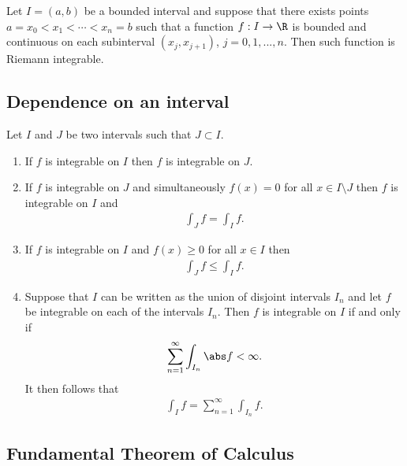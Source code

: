 \documentclass{article}
\begin{document}
\begin{corollary*}
   Let $I=(a,b)$ be a bounded interval and suppose that there exists points $a=x_0<x_1<\cdots<x_n=b$
   such that a function $f:I\to\R$ is bounded and continuous on each subinterval $(x_j,x_{j+1})$,
   $j=0,1,...,n$. Then such function is Riemann integrable.
\end{corollary*}

\subsection{Dependence on an interval}

\begin{theorem}[Notes 4.8]
    Let $I$ and $J$ be two intervals such that $J\subset I$.
    \begin{enumerate}
        \item If $f$ is integrable on $I$ then $f$ is integrable on $J$.
        \item If $f$ is integrable on $J$ and simultaneously $f(x)=0$ for all $x\in I\setminus J$
            then $f$ is integrable on $I$ and \begin{align*}
                \int_J f = \int_I f.
            \end{align*} 
        \item If $f$ is integrable on $I$ and $f(x)\geq 0$ for all $x\in I$ then \begin{align*}
            \int_J f \leq \int_I f.
        \end{align*}
        \item Suppose that $I$ can be written as the union of disjoint intervals $I_n$ and let $f$
            be integrable on each of the intervals $I_n$. Then $f$ is integrable on $I$ if and only if
            \begin{align*}
                \sum_{n=1}^\infty \int_{I_n} \abs f < \infty.
            \end{align*}
            It then follows that \begin{align*}
                \int_I f = \sum_{n=1}^\infty \int_{I_n}f.
            \end{align*}
    \end{enumerate} 
\end{theorem}

\subsection{Fundamental Theorem of Calculus}
\end{document}
